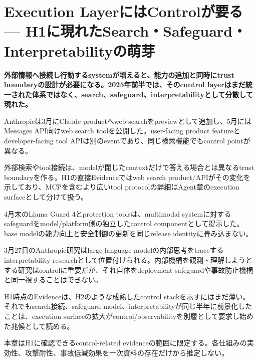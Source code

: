 \section{Execution LayerにはControlが要る — H1に現れたSearch・Safeguard・Interpretabilityの萌芽}
\label{pkg:control}
\noindent\textbf{外部情報へ接続し行動するsystemが増えると、能力の追加と同時にtrust boundaryの設計が必要になる。2025年前半では、そのcontrol layerはまだ統一された体系ではなく、search、safeguard、interpretabilityとして分散して現れた。}\autocite{src-383476bdf62e,src-6e15bd50b7db,src-fdc10e3226e6}

Anthropicは3月にClaude productへweb searchをpreviewとして追加し、5月にはMessages API向けweb search toolを公開した。user-facing product featureとdeveloper-facing tool APIは別のeventであり、同じ検索機能でもcontrol pointが異なる。\autocite{src-6e15bd50b7db,src-e31c642d34b6}


外部検索やtool接続は、modelが閉じたcontextだけで答える場合とは異なるtrust boundaryを作る。H1の直接Evidenceではweb search product/APIがその変化を示しており、MCPを含むより広いtool protocolの詳細はAgent章のexecution surfaceとして分けて扱う。\autocite{src-6e15bd50b7db,src-e31c642d34b6}


4月末のLlama Guard 4とprotection toolsは、multimodal systemに対するsafeguardをmodel/platform側の独立したcontrol componentとして提示した。base modelの能力向上と安全制御の更新を同じrelease identityに畳み込まない。\autocite{src-383476bdf62e}


3月27日のAnthropic研究はlarge language modelの内部思考をtraceするinterpretability researchとして位置付けられる。内部機構を観測・理解しようとする研究はcontrolに重要だが、それ自体をdeployment safeguardや事故防止機構と同一視することはできない。\autocite{src-fdc10e3226e6}


H1時点のEvidenceは、H2のような成熟したcontrol stackを示すにはまだ薄い。それでもsearch接続、safeguard model、interpretabilityが同じ半年に前景化したことは、execution surfaceの拡大がcontrol/observabilityを別層として要求し始めた兆候として読める。\autocite{src-383476bdf62e,src-e31c642d34b6,src-fdc10e3226e6}


\begin{claimboundary}
本章はH1に確認できるcontrol-related evidenceの範囲に限定する。各仕組みの実効性、攻撃耐性、事故低減効果を一次資料の存在だけから推定しない。
\end{claimboundary}
